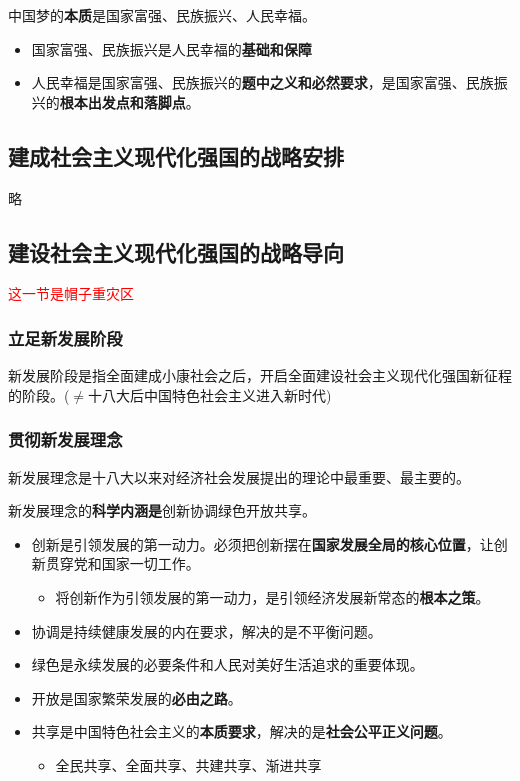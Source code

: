 \documentclass[12pt, a4paper, oneside]{ctexart}
\begin{document}
中国梦的\textbf{本质}是国家富强、民族振兴、人民幸福。

\begin{itemize}
  \item 国家富强、民族振兴是人民幸福的\textbf{基础和保障}
  \item 人民幸福是国家富强、民族振兴的\textbf{题中之义和必然要求}，是国家富强、民族振兴的\textbf{根本出发点和落脚点}。
\end{itemize}

\subsection{建成社会主义现代化强国的战略安排}

略

\subsection{建设社会主义现代化强国的战略导向}

\textcolor{red}{这一节是帽子重灾区}

\vspace*{10pt}

\subsubsection{立足新发展阶段}

新发展阶段是指全面建成小康社会之后，开启全面建设社会主义现代化强国新征程的阶段。($\neq$十八大后中国特色社会主义进入新时代)

\subsubsection{贯彻新发展理念}

新发展理念是十八大以来对经济社会发展提出的理论中最重要、最主要的。

新发展理念的\textbf{科学内涵是}创新协调绿色开放共享。

\begin{itemize}
  \item 创新是引领发展的第一动力。必须把创新摆在\textbf{国家发展全局的核心位置}，让创新贯穿党和国家一切工作。
  \begin{itemize}
    \item 将创新作为引领发展的第一动力，是引领经济发展新常态的\textbf{根本之策}。
  \end{itemize}
  \item 协调是持续健康发展的内在要求，解决的是不平衡问题。
  \item 绿色是永续发展的必要条件和人民对美好生活追求的重要体现。
  \item 开放是国家繁荣发展的\textbf{必由之路}。
  \item 共享是中国特色社会主义的\textbf{本质要求}，解决的是\textbf{社会公平正义问题}。
  \begin{itemize}
    \item 全民共享、全面共享、共建共享、渐进共享
  \end{itemize}
\end{itemize}
\end{document}
